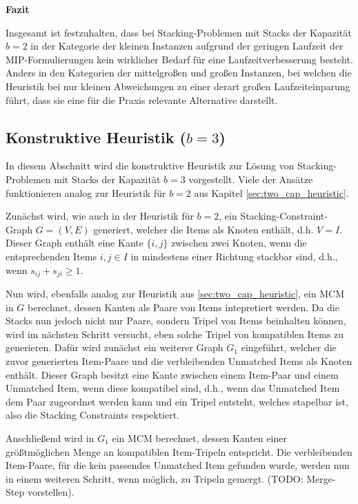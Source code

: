 \textbf{Fazit}

Insgesamt ist festzuhalten, dass bei Stacking-Problemen mit Stacks der Kapazität $b = 2$ in der Kategorie der kleinen Instanzen
aufgrund der geringen Laufzeit der MIP-Formulierungen kein wirklicher Bedarf für eine Laufzeitverbesserung besteht.
Anders in den Kategorien der mittelgroßen und großen Instanzen, bei welchen die Heuristik bei nur kleinen Abweichungen zu einer
derart großen Laufzeiteinparung führt, dass sie eine für die Praxis relevante Alternative darstellt.

\subsection{Konstruktive Heuristik ($b = 3$)}
\label{sec:three_cap_heuristic}

In diesem Abschnitt wird die konstruktive Heuristik zur Lösung von Stacking-Problemen
mit Stacks der Kapazität $b = 3$ vorgestellt. Viele der Ansätze funktionieren analog zur Heuristik für $b = 2$
aus Kapitel \ref{sec:two_cap_heuristic}.

Zunächst wird, wie auch in der Heuristik für $b = 2$, ein Stacking-Constraint-Graph $G = (V, E)$ generiert, welcher die Items
als Knoten enthält, d.h. $V = I$. Dieser Graph enthält eine Kante $\{i, j\}$ zwischen zwei Knoten,
wenn die entsprechenden Items $i, j \in I$ in mindestens einer Richtung stackbar sind, d.h., wenn $s_{ij} + s_{ji} \geq 1$.

Nun wird, ebenfalls analog zur Heuristik aus \ref{sec:two_cap_heuristic}, ein \textsc{MCM} in $G$ berechnet,
dessen Kanten als Paare von Items intepretiert werden.
Da die Stacks nun jedoch nicht nur Paare, sondern Tripel von Items beinhalten können, wird im nächsten Schritt versucht,
eben solche Tripel von kompatiblen Items zu generieren. Dafür wird zunächst ein weiterer Graph $G_1$ eingeführt,
welcher die zuvor generierten Item-Paare und die verbleibenden Unmatched Items als Knoten enthält.
Dieser Graph besitzt eine Kante zwischen einem Item-Paar und einem Unmatched Item,
wenn diese kompatibel sind, d.h., wenn das Unmatched Item dem Paar zugeordnet werden kann und ein Tripel entsteht, welches
stapelbar ist, also die Stacking Constraints respektiert.

Anschließend wird in $G_1$ ein \textsc{MCM} berechnet, dessen Kanten einer größtmöglichen Menge an kompatiblen Item-Tripeln entspricht.
Die verbleibenden Item-Paare, für die kein passendes Unmatched Item gefunden wurde, werden nun in einem weiteren Schritt,
wenn möglich, zu Tripeln gemergt. (TODO: Merge-Step vorstellen).

